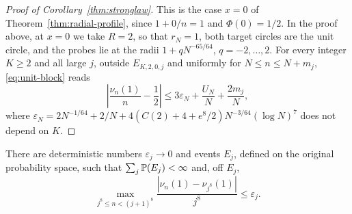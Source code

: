 \begin{proof}[Proof of Corollary~\ref{thm:stronglaw}]
This is the case $x=0$ of Theorem~\ref{thm:radial-profile}, since
$1+0/n=1$ and $\Phi(0)=1/2$.
In the proof above, at $x=0$ we take $R=2$, so that $r_N=1$, both target
circles are the unit circle, and the probes lie at the radii
$1+qN^{-65/64}$, $q=-2,\dots,2$. For every integer $K\ge2$ and all large
$j$, outside $E_{K,2,0,j}$ and uniformly for $N\le n\le N+m_j$,
\eqref{eq:unit-block} reads
\begin{equation}
 \left|\frac{\nu_n(1)}n-\frac12\right|
 \le3\varepsilon_N+\frac{U_N}N+\frac{2m_j}N,
 \label{eq:unit-circle-block}
\end{equation}
where $\varepsilon_N=2N^{-1/64}+2/N+4(C(2)+4+e^{8}/2)N^{-3/64}(\log N)^7$
does not depend on $K$.
\end{proof}

\begin{remark}\label{rem:block-envelope}
There are deterministic numbers $\varepsilon_j\to0$ and events $E_j$,
defined on the original probability space, such that
$\sum_j\mathbb P(E_j)<\infty$ and, off $E_j$,
\[
 \max_{j^8\le n<(j+1)^8}\frac{|\nu_n(1)-\nu_{j^8}(1)|}{j^8}\le\varepsilon_j.
\]
\end{remark}

